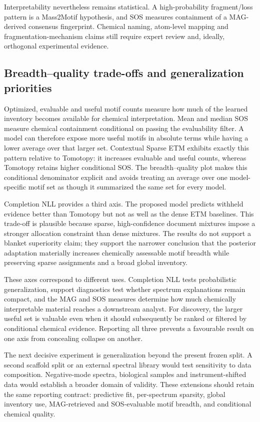 \documentclass[10pt,a4paper]{article}
\begin{document}
Interpretability nevertheless remains statistical. A high-probability
fragment/loss pattern is a Mass2Motif hypothesis, and SOS measures containment
of a MAG-derived consensus fingerprint. Chemical naming, atom-level mapping and
fragmentation-mechanism claims still require expert review and, ideally,
orthogonal experimental evidence.

\subsection{Breadth--quality trade-offs and generalization priorities}

Optimized, evaluable and useful motif counts measure how much of the learned
inventory becomes available for chemical interpretation. Mean and median SOS
measure chemical containment conditional on passing the evaluability filter.
A model can therefore expose more useful motifs in absolute terms while having
a lower average over that larger set. Contextual Sparse ETM exhibits exactly
this pattern relative to Tomotopy: it increases evaluable and useful counts,
whereas Tomotopy retains higher conditional SOS. The breadth--quality
plot makes this conditional denominator explicit and avoids treating an average
over one model-specific motif set as though it summarized the same set for every
model.

Completion NLL provides a third axis. The proposed model predicts withheld
evidence better than Tomotopy but not as well as the dense ETM baselines. This
trade-off is plausible because sparse, high-confidence document mixtures impose
a stronger allocation constraint than dense mixtures. The results do not
support a blanket superiority claim; they support the narrower conclusion that
the posterior adaptation materially increases chemically assessable motif
breadth while preserving sparse assignments and a broad global inventory.

These axes correspond to different uses. Completion NLL tests probabilistic
generalization, support diagnostics test whether spectrum explanations remain
compact, and the MAG and SOS measures determine how much chemically interpretable
material reaches a downstream analyst. For discovery, the larger useful set is
valuable even when it should subsequently be ranked or filtered by conditional
chemical evidence. Reporting all three prevents a favourable result on one axis
from concealing collapse on another.

The next decisive experiment is generalization beyond the present frozen split.
A second scaffold split or an external spectral library would test sensitivity
to data composition. Negative-mode spectra, biological samples and
instrument-shifted data would establish a broader domain of validity. These extensions should
retain the same reporting contract: predictive fit, per-spectrum sparsity,
global inventory use, MAG-retrieved and SOS-evaluable motif breadth, and
conditional chemical quality.
\end{document}
